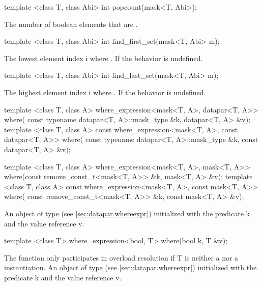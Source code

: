 \begin{itemdecl}
template <class T, class Abi> int popcount(mask<T, Abi>);
\end{itemdecl}
\begin{itemdescr}
  \pnum\returns The number of boolean elements that are \true.
\end{itemdescr}

\begin{itemdecl}
template <class T, class Abi> int find_first_set(mask<T, Abi> m);
\end{itemdecl}
\begin{itemdescr}
  \pnum\returns The lowest element index \code i where .
  \pnum\remarks If  the behavior is undefined.
\end{itemdescr}

\begin{itemdecl}
template <class T, class Abi> int find_last_set(mask<T, Abi> m);
\end{itemdecl}
\begin{itemdescr}
  \pnum\returns The highest element index \code i where .
  \pnum\remarks If  the behavior is undefined.
\end{itemdescr}

\begin{itemdecl}
template <class T, class A>
where_expression<mask<T, A>, datapar<T, A>> where(
    const typename datapar<T, A>::mask_type &k, datapar<T, A> &v);
template <class T, class A>
const where_expression<mask<T, A>, const datapar<T, A>> where(
    const typename datapar<T, A>::mask_type &k, const datapar<T, A> &v);

template <class T, class A>
where_expression<mask<T, A>, mask<T, A>> where(const remove_const_t<mask<T, A>> &k,
                                               mask<T, A> &v);
template <class T, class A>
const where_expression<mask<T, A>, const mask<T, A>> where(
    const remove_const_t<mask<T, A>> &k, const mask<T, A> &v);
\end{itemdecl}
\begin{itemdescr}
  \pnum\returns An object of type  (see \ref{sec:datapar.whereexpr}) initialized with the predicate \code k and the value reference \code v.
\end{itemdescr}

\begin{itemdecl}
template <class T> where_expression<bool, T> where(bool k, T &v);
\end{itemdecl}
\begin{itemdescr}
  \pnum\remarks The function only participates in overload resolution if \type T is neither a \datapar nor a \mask instantiation.
  \pnum\returns An object of type  (see \ref{sec:datapar.whereexpr}) initialized with the predicate \code k and the value reference \code v.
\end{itemdescr}

